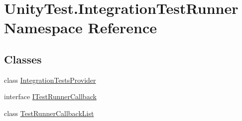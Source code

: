\hypertarget{namespace_unity_test_1_1_integration_test_runner}{}\section{Unity\+Test.\+Integration\+Test\+Runner Namespace Reference}
\label{namespace_unity_test_1_1_integration_test_runner}
\subsection*{Classes}
\begin{DoxyCompactItemize}
\item 
class \hyperlink{class_unity_test_1_1_integration_test_runner_1_1_integration_tests_provider}{Integration\+Tests\+Provider}
\item 
interface \hyperlink{interface_unity_test_1_1_integration_test_runner_1_1_i_test_runner_callback}{I\+Test\+Runner\+Callback}
\item 
class \hyperlink{class_unity_test_1_1_integration_test_runner_1_1_test_runner_callback_list}{Test\+Runner\+Callback\+List}
\end{DoxyCompactItemize}
